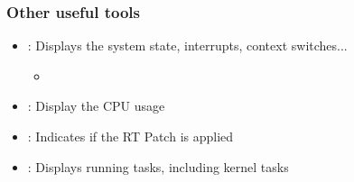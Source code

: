 \begin{frame}
        \frametitle{Other useful tools}
        \begin{itemize}
                \item {}: Displays the system state, interrupts, context switches...
                        \begin{itemize}
                                \item {}
                        \end{itemize}
                \item {}: Display the CPU usage
                \item {}: Indicates if the RT Patch is applied
                \item {}: Displays running tasks, including kernel tasks
        \end{itemize}
\end{frame}

